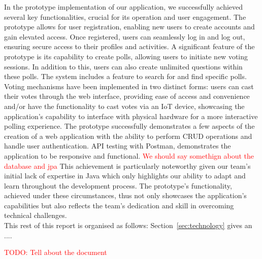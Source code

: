 \noindent In the prototype implementation of our application, we successfully achieved several key functionalities, crucial for its operation and user engagement. The prototype allows for user registration, enabling new users to create accounts and gain elevated access. Once registered, users can seamlessly log in and log out, ensuring secure access to their profiles and activities. A significant feature of the prototype is its capability to create polls, allowing users to initiate new voting sessions. In addition to this, users can also create unlimited questions within these polls. The system includes a feature to search for and find specific polls. Voting mechanisms have been implemented in two distinct forms: users can cast their votes through the web interface, providing ease of access and convenience and/or  have the functionality to cast votes via an IoT device, showcasing the application's capability to interface with physical hardware for a more interactive polling experience.  The prototype successfully demonstrates a few aspects of the creation of a web application with the ability to perform CRUD operations and handle user authentication.  API testing with Postman, demonstrates the application to be responsive and functional. \textcolor{red}{We should say somethign about the database and jpa} This achievement is particularly noteworthy given our team's initial lack of expertise in Java which only highlights our ability to adapt and learn throughout the development process. The prototype's functionality, achieved under these circumstances, thus not only showcases the application's capabilities but also reflects the team's dedication and skill in overcoming technical challenges.\\


\noindent This rest of this report is organised as follows:
Section~\ref{sec:technology} gives an ....


\textcolor{red}{TODO: Tell about the document}